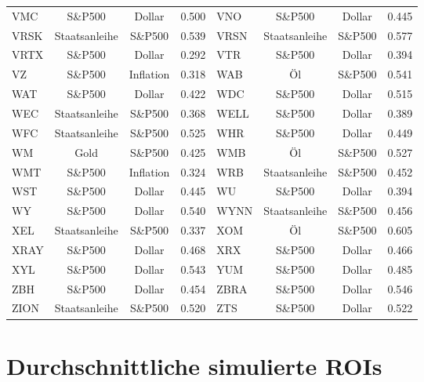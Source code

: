 \begin{longtable}{l c c c | l c c c}
    VMC    & S\&P500       & Dollar    & 0.500         & VNO    & S\&P500       & Dollar    & 0.445         \\
    VRSK   & Staatsanleihe & S\&P500   & 0.539         & VRSN   & Staatsanleihe & S\&P500   & 0.577         \\
    VRTX   & S\&P500       & Dollar    & 0.292         & VTR    & S\&P500       & Dollar    & 0.394         \\
    VZ     & S\&P500       & Inflation & 0.318         & WAB    & Öl            & S\&P500   & 0.541         \\
    WAT    & S\&P500       & Dollar    & 0.422         & WDC    & S\&P500       & Dollar    & 0.515         \\
    WEC    & Staatsanleihe & S\&P500   & 0.368         & WELL   & S\&P500       & Dollar    & 0.389         \\
    WFC    & Staatsanleihe & S\&P500   & 0.525         & WHR    & S\&P500       & Dollar    & 0.449         \\
    WM     & Gold          & S\&P500   & 0.425         & WMB    & Öl            & S\&P500   & 0.527         \\
    WMT    & S\&P500       & Inflation & 0.324         & WRB    & Staatsanleihe & S\&P500   & 0.452         \\
    WST    & S\&P500       & Dollar    & 0.445         & WU     & S\&P500       & Dollar    & 0.394         \\
    WY     & S\&P500       & Dollar    & 0.540         & WYNN   & Staatsanleihe & S\&P500   & 0.456         \\
    XEL    & Staatsanleihe & S\&P500   & 0.337         & XOM    & Öl            & S\&P500   & 0.605         \\
    XRAY   & S\&P500       & Dollar    & 0.468         & XRX    & S\&P500       & Dollar    & 0.466         \\
    XYL    & S\&P500       & Dollar    & 0.543         & YUM    & S\&P500       & Dollar    & 0.485         \\
    ZBH    & S\&P500       & Dollar    & 0.454         & ZBRA   & S\&P500       & Dollar    & 0.546         \\
    ZION   & Staatsanleihe & S\&P500   & 0.520         & ZTS    & S\&P500       & Dollar    & 0.522         \\
\end{longtable}

\section{Durchschnittliche simulierte ROIs}

